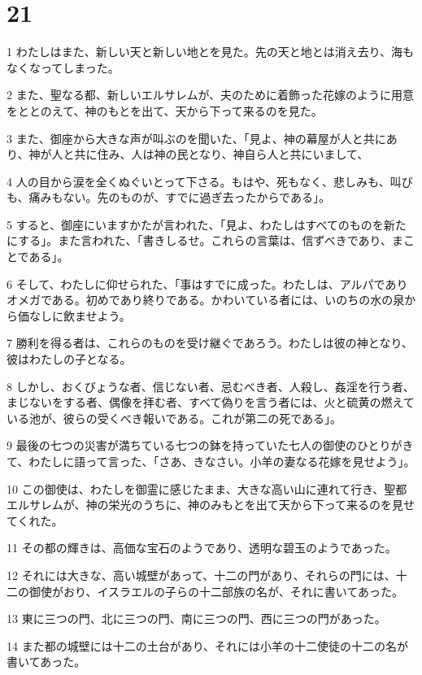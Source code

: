 \chapter{21}

\par 1 わたしはまた、新しい天と新しい地とを見た。先の天と地とは消え去り、海もなくなってしまった。
\par 2 また、聖なる都、新しいエルサレムが、夫のために着飾った花嫁のように用意をととのえて、神のもとを出て、天から下って来るのを見た。
\par 3 また、御座から大きな声が叫ぶのを聞いた、「見よ、神の幕屋が人と共にあり、神が人と共に住み、人は神の民となり、神自ら人と共にいまして、
\par 4 人の目から涙を全くぬぐいとって下さる。もはや、死もなく、悲しみも、叫びも、痛みもない。先のものが、すでに過ぎ去ったからである」。
\par 5 すると、御座にいますかたが言われた、「見よ、わたしはすべてのものを新たにする」。また言われた、「書きしるせ。これらの言葉は、信ずべきであり、まことである」。
\par 6 そして、わたしに仰せられた、「事はすでに成った。わたしは、アルパでありオメガである。初めであり終りである。かわいている者には、いのちの水の泉から価なしに飲ませよう。
\par 7 勝利を得る者は、これらのものを受け継ぐであろう。わたしは彼の神となり、彼はわたしの子となる。
\par 8 しかし、おくびょうな者、信じない者、忌むべき者、人殺し、姦淫を行う者、まじないをする者、偶像を拝む者、すべて偽りを言う者には、火と硫黄の燃えている池が、彼らの受くべき報いである。これが第二の死である」。
\par 9 最後の七つの災害が満ちている七つの鉢を持っていた七人の御使のひとりがきて、わたしに語って言った、「さあ、きなさい。小羊の妻なる花嫁を見せよう」。
\par 10 この御使は、わたしを御霊に感じたまま、大きな高い山に連れて行き、聖都エルサレムが、神の栄光のうちに、神のみもとを出て天から下って来るのを見せてくれた。
\par 11 その都の輝きは、高価な宝石のようであり、透明な碧玉のようであった。
\par 12 それには大きな、高い城壁があって、十二の門があり、それらの門には、十二の御使がおり、イスラエルの子らの十二部族の名が、それに書いてあった。
\par 13 東に三つの門、北に三つの門、南に三つの門、西に三つの門があった。
\par 14 また都の城壁には十二の土台があり、それには小羊の十二使徒の十二の名が書いてあった。
